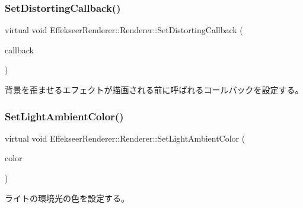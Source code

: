 \subsubsection{\texorpdfstring{Set\+Distorting\+Callback()}{SetDistortingCallback()}}
{\footnotesize\ttfamily virtual void Effekseer\+Renderer\+::\+Renderer\+::\+Set\+Distorting\+Callback (\begin{DoxyParamCaption}\item[{\mbox{\hyperlink{class_effekseer_renderer_1_1_distorting_callback}{Distorting\+Callback}} $\ast$}]{callback }\end{DoxyParamCaption})\hspace{0.3cm}{\ttfamily [pure virtual]}}



背景を歪ませるエフェクトが描画される前に呼ばれるコールバックを設定する。 

\mbox{\label{class_effekseer_renderer_1_1_renderer_aebc954d0b421ded11b7420361b987094}} 
\subsubsection{\texorpdfstring{Set\+Light\+Ambient\+Color()}{SetLightAmbientColor()}}
{\footnotesize\ttfamily virtual void Effekseer\+Renderer\+::\+Renderer\+::\+Set\+Light\+Ambient\+Color (\begin{DoxyParamCaption}\item[{\+::\mbox{\hyperlink{struct_effekseer_1_1_color}{Effekseer\+::\+Color}} \&}]{color }\end{DoxyParamCaption})\hspace{0.3cm}{\ttfamily [pure virtual]}}



ライトの環境光の色を設定する。 

\mbox{\label{class_effekseer_renderer_1_1_renderer_a53268363d6c1ed36bd9119860d058808}} 

